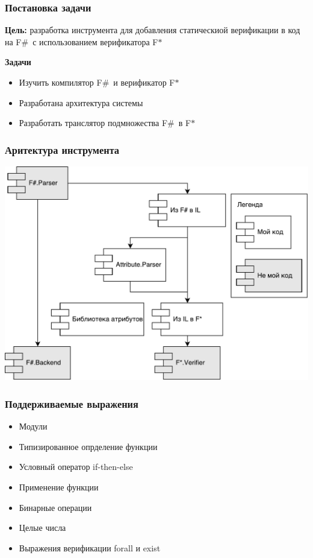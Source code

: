 \documentclass{beamer}
\def \fstar {F$\ast$}
\def \fsharp {F$\#$}
\begin{document}
\begin{frame}
  \transwipe[direction=90]
  \frametitle{Постановка задачи}
  \textbf{Цель:} разработка инструмента для добавления статическиой верификации в код на \fsharp~с использованием верификатора \fstar
  
  \textbf{Задачи}
  \begin{itemize}
    \item Изучить компилятор \fsharp~и верификатор \fstar
    \item Разработана архитектура системы
    \item Разработать транслятор подмножества \fsharp~в \fstar
  \end{itemize}
  
\end{frame}

\begin{frame}
  \transwipe[direction=90]
  \frametitle{Аритектура инструмента}
  \center
  \includegraphics[width=0.9\linewidth]{Teh}
\end{frame}


\begin{frame}[fragile]
  \transwipe[direction=90]
  \frametitle{Поддерживаемые выражения}
  \begin{itemize}
    \item Модули
    \item Типизированное опрделение функции
    \item Условный оператор if-then-else
    \item Применение функции
    \item Бинарные операции
    \item Целые числа
    \item Выражения верификации forall и exist
  \end{itemize}
\end{frame}
\end{document}
